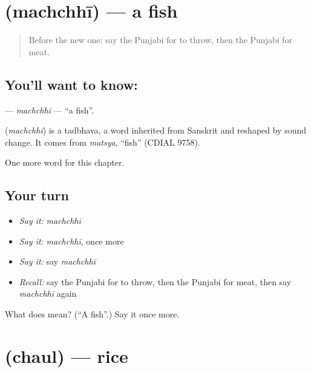 \section[\texorpdfstring{\pa{ਮੱਛੀ} (machchhī)}{ਮੱਛੀ (machchhī)}]{ (machchhī) — a fish}

\label{lesson:PA-C63-machchhi}



\begin{quote}
Before the new one: say the Punjabi for to throw, then the Punjabi for meat.
\end{quote}

\subsection*{You'll want to know: }
\textbf{} — \emph{machchhī} — \textquotedblleft{}a fish\textquotedblright{}.

\begin{cousinweb}
\textbf{} (\emph{machchhī}) is a tadbhava, a word inherited from Sanskrit and reshaped by sound change. It comes from \emph{matsya}, \textquotedblleft{}fish\textquotedblright{} (CDIAL 9758).
\end{cousinweb}

\begin{grammarlens}[title={What you've built}]
One more word for this chapter.
\end{grammarlens}

\subsection*{Your turn}
\begin{itemize}
\raggedright
  \item \emph{Say it:} \emph{machchhī}
  \item \emph{Say it:} \emph{machchhī}, once more
  \item \emph{Say it:} say \emph{machchhī}
  \item \emph{Recall:} say the Punjabi for to throw, then the Punjabi for meat, then say \emph{machchhī} again
\end{itemize}

\begin{tcolorbox}[breakable,colback=teal!4,colframe=teal!35!black,title={Before you move on}]
What does  mean? (\textquotedblleft{}A fish\textquotedblright{}.) Say it once more.
\end{tcolorbox}
\section[\texorpdfstring{\pa{ਚੌਲ} (chaul)}{ਚੌਲ (chaul)}]{ (chaul) — rice}

